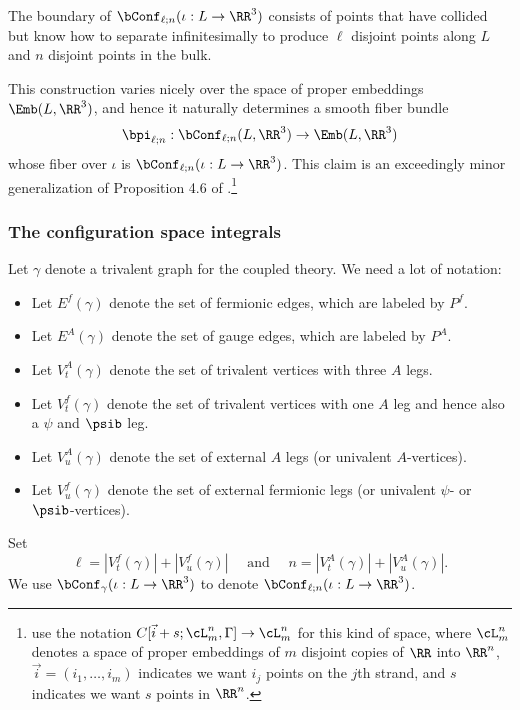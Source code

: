 \documentclass[10pt]{amsart}
\newcommand{\og}[1]{\todo[noline,color=pink!15,linecolor=blue!40!black,size=\tiny]{OG: #1}}
\begin{document}
The boundary of $\bConf_{\ell;n}(\iota: L \to \RR^3)$ consists of points that have collided but know how to separate infinitesimally to produce $\ell$ disjoint points along $L$ and $n$ disjoint points in the bulk.

This construction varies nicely over the space of proper embeddings $\Emb(L, \RR^3)$, 
and hence it naturally determines a smooth fiber bundle 
\[
\bpi_{\ell;n}: \bConf_{\ell;n}(L,\RR^3) \to \Emb(L,\RR^3)
\]
whose fiber over $\iota$ is $\bConf_{\ell;n}(\iota: L \to \RR^3)$.
This claim is an exceedingly minor generalization of Proposition 4.6 of \cite{KMV}.\footnote{\cite{KMV} use the notation $C[\vec{i}+s; \cL^n_m, \Gamma] \to \cL^n_m$ for this kind of space, 
where $\cL^n_m$ denotes a space of proper embeddings of $m$ disjoint copies of $\RR$ into $\RR^n$,
$\vec{i} = (i_1,\ldots,i_m)$ indicates we want $i_j$ points on the $j$th strand, and $s$ indicates we want $s$ points in $\RR^n$.}

\subsubsection{The configuration space integrals}
\label{subsec: defect integrals}

Let $\gamma$ denote a trivalent graph for the coupled theory.
We need a lot of notation:
\begin{itemize}
\item Let $E^f(\gamma)$ denote the set of fermionic edges, which are labeled by $P^f$.
\item Let $E^A(\gamma)$ denote the set of gauge edges, which are labeled by $P^A$.
\item Let $V^A_t(\gamma)$ denote the set of trivalent vertices with three $A$ legs.
\item Let $V^f_t(\gamma)$ denote the set of trivalent vertices with one $A$ leg and hence also a $\psi$ and $\psib$ leg.
\item Let $V^A_u(\gamma)$ denote the set of external $A$ legs (or univalent $A$-vertices).
\item Let $V^f_u(\gamma)$ denote the set of external fermionic legs (or univalent $\psi$- or $\psib$-vertices).
\end{itemize}
Set 
\[
\ell = |V^f_t(\gamma)|+ |V^f_u(\gamma)| \quad\text{ and }\quad n = |V^A_t(\gamma)|+|V^A_u(\gamma)|.
\]
We use $\bConf_{\gamma}(\iota: L \to \RR^3)$ to denote $\bConf_{\ell;n}(\iota: L \to \RR^3)$.
\end{document}
